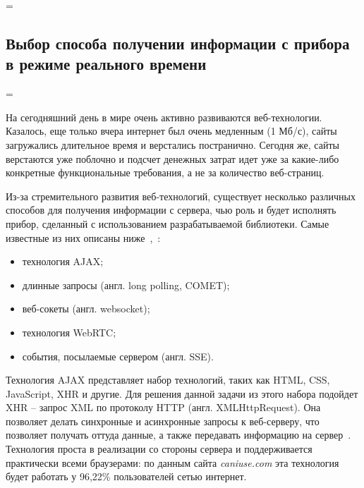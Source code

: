 
\newdimen\origiwstr
\origiwstr=\font
{}\origiwstr
\subsection{Выбор способа получении информации с прибора в режиме реального времени}
\font=\origiwstr

На сегодняшний день в мире очень активно развиваются веб-техноло\-гии. Казалось,
еще только вчера интернет был очень медленным (1 Мб/с), сайты загружались
длительное время и верстались постранично. Сегодня же, сайты верстаются уже
поблочно и подсчет денежных затрат идет уже за какие-либо конкретные функциональные
требования, а не за количество веб-страниц.

Из-за стремительного развития веб-технологий, существует несколько различных
способов для получения информации с сервера, чью роль и будет исполнять прибор,
сделанный с использованием разрабатываемой библиотеки. Самые известные из них описаны
ниже~\cite{web_client_server_communication_select_site},~\cite{professional_js_book}:
\begin{itemize}
    \item технология AJAX;
    \item длинные запросы (англ. long polling, COMET);
    \item веб-сокеты (англ. websocket);
    \item технология WebRTC;
    \item события, посылаемые сервером (англ. SSE).
\end{itemize}


Технология AJAX представляет набор технологий, таких как HTML, CSS, JavaScript, XHR
и другие. Для решения данной задачи из этого набора подойдет XHR -- запрос XML
по протоколу HTTP (англ. XMLHttpRequest). Она позволяет делать синхронные и
асинхронные запросы к веб-серверу, что позволяет получать оттуда данные,
а также передавать информацию на сервер~\cite{ajax_mdn_site}.
Технология проста в реализации со стороны сервера и поддерживается
практически всеми браузерами: по данным сайта
\textit{caniuse.com} эта технология будет работать у 96,22\% пользователей
сетью интернет.

